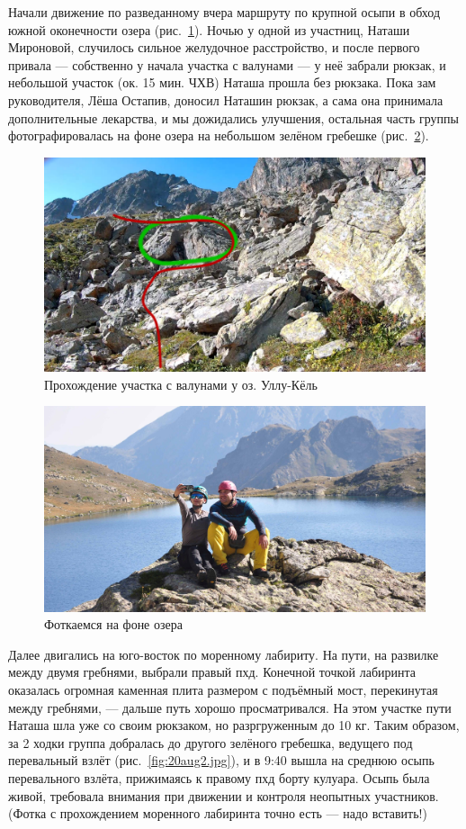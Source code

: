 Начали движение по разведанному вчера маршруту по крупной осыпи в обход южной оконечности озера (рис.~\ref{ullu_koel_lake_stones}). Ночью у одной из участниц, Наташи Мироновой, случилось сильное желудочное расстройство, и после первого  привала --- собственно у начала участка с валунами --- у неё забрали рюкзак, и небольшой участок (ок. 15 мин. ЧХВ) Наташа прошла без рюкзака. Пока зам руководителя, Лёша Остапив, доносил Наташин рюкзак, а сама она принимала дополнительные лекарства, и мы дожидались улучшения, остальная часть группы фотографировалась на фоне озера на небольшом зелёном гребешке (рис.~\ref{fig:DSC_0907}).
\begin{figure}[h!]
	\centering
	\includegraphics[width=0.7\linewidth]{../pics/ullu_koel_lake_stones.jpg}
	\caption{Прохождение участка с валунами у оз. Уллу-Кёль}
	\label{ullu_koel_lake_stones}
\end{figure}

 
 \begin{figure}[h!]
 	\centering
 	\includegraphics[width=0.7\linewidth]{../pics/DSC_0907}
 	\caption{Фоткаемся на фоне озера}
 	\label{fig:DSC_0907}
 \end{figure}
 

Далее двигались на юго-восток по моренному лабириту. На пути, на развилке между двумя гребнями, выбрали правый пхд. Конечной точкой лабиринта оказалась огромная каменная плита размером с подъёмный мост, перекинутая между гребнями, --- дальше путь хорошо просматривался. На этом участке пути Наташа шла уже со своим рюкзаком, но разргруженным до 10 кг. Таким образом, за 2 ходки группа добралась до другого зелёного гребешка, ведущего под перевальный взлёт (рис.~\ref{fig:20aug2.jpg}), и в 9:40 вышла на среднюю осыпь перевального взлёта, прижимаясь к правому пхд борту кулуара. Осыпь была живой, требовала внимания при движении и контроля неопытных участников. \alert{(Фотка с прохождением моренного лабиринта точно есть --- надо вставить!)}

